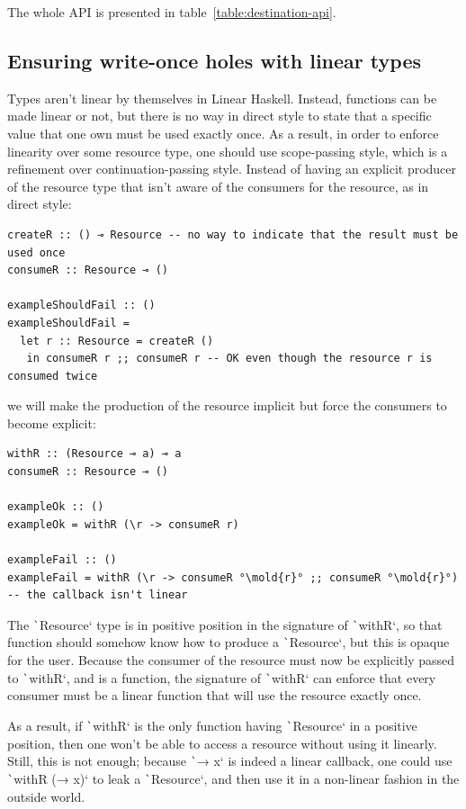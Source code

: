 \documentclass[english]{jflart}
\newcommand{\mold}[1]{\colorbox{red}{#1}}
\begin{document}
The whole API is presented in table~\ref{table:destination-api}.

\subsection{Ensuring write-once holes with linear types}\label{ssec:api-linearity}

Types aren't linear by themselves in Linear Haskell. Instead, functions can be made linear or not, but there is no way in direct style to state that a specific value that one own must be used exactly once. As a result, in order to enforce linearity over some resource type, one should use scope-passing style, which is a refinement over continuation-passing style. Instead of having an explicit producer of the resource type that isn't aware of the consumers for the resource, as in direct style:

{\small
\begin{verbatim}
createR :: () ⊸ Resource -- no way to indicate that the result must be used once
consumeR :: Resource ⊸ ()

exampleShouldFail :: ()
exampleShouldFail =
  let r :: Resource = createR ()
   in consumeR r ;; consumeR r -- OK even though the resource r is consumed twice
\end{verbatim}
}

we will make the production of the resource implicit but force the consumers to become explicit:

{\small
\begin{verbatim}
withR :: (Resource ⊸ a) ⊸ a
consumeR :: Resource ⊸ ()

exampleOk :: ()
exampleOk = withR (\r -> consumeR r)

exampleFail :: ()
exampleFail = withR (\r -> consumeR °\mold{r}° ;; consumeR °\mold{r}°) -- the callback isn't linear
\end{verbatim}
}

The \texttt`Resource` type is in positive position in the signature of \texttt`withR`, so that function should somehow know how to produce a \texttt`Resource`, but this is opaque for the user. Because the consumer of the resource must now be explicitly passed to \texttt`withR`, and is a function, the signature of \texttt`withR` can enforce that every consumer must be a linear function that will use the resource exactly once.

As a result, if \texttt`withR` is the only function having \texttt`Resource` in a positive position, then one won't be able to access a resource without using it linearly. Still, this is not enough; because \texttt`\x → x` is indeed a linear callback, one could use \texttt`withR (\x → x)` to leak a \texttt`Resource`, and then use it in a non-linear fashion in the outside world.
\end{document}

